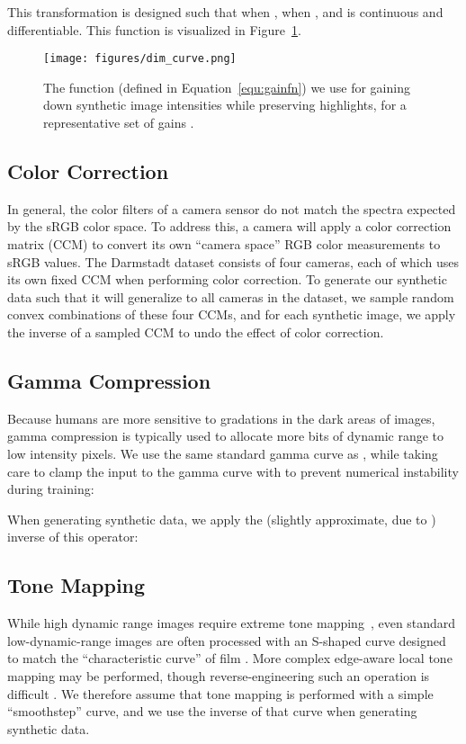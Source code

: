 \documentclass[10pt,twocolumn,letterpaper]{article}
\begin{document}
This transformation is designed such that  when ,  when , and  is continuous and differentiable. This function is visualized in Figure~\ref{fig:dim_curve}.

\begin{figure}[t]
\begin{center}
   \texttt{[image: figures/dim\_curve.png]}
\end{center}
   \caption{The function  (defined in Equation~\ref{equ:gainfn}) we use for gaining down synthetic image intensities  while preserving highlights, for a representative set of gains .}
\label{fig:dim_curve}
\end{figure}


\subsection{Color Correction}
\label{sec:ccm}

In general, the color filters of a camera sensor do not match the spectra expected by the sRGB color space. To address this, a camera will apply a  color correction matrix (CCM) to convert its own ``camera space'' RGB color measurements to sRGB values. The Darmstadt dataset consists of four cameras, each of which uses its own fixed CCM when performing color correction. To generate our synthetic data such that it will generalize to all cameras in the dataset, we sample random convex combinations of these four CCMs, and for each synthetic image, we apply the inverse of a sampled CCM to undo the effect of color correction.

\subsection{Gamma Compression}
\label{sec:gamma}

Because humans are more sensitive to gradations in the dark areas of images, gamma compression is typically used to allocate more bits of dynamic range to low intensity pixels. We use the same standard gamma curve as \cite{plotz2017cvpr}, while taking care to clamp the input to the gamma curve with  to prevent numerical instability during training:

When generating synthetic data, we apply the (slightly approximate, due to ) inverse of this operator:


\subsection{Tone Mapping}
\label{sec:tonemap}
While high dynamic range images require extreme tone mapping~\cite{Debevec1997}, even standard low-dynamic-range images are often processed with an S-shaped curve designed to match the ``characteristic curve'' of film \cite{davis1922sensitometry}.
More complex edge-aware local tone mapping may be performed, though reverse-engineering such an operation is difficult \cite{Paris2011}.
We therefore assume that tone mapping is performed with a simple ``smoothstep'' curve, and we use the inverse of that curve when generating synthetic data.
\end{document}
